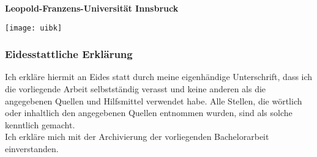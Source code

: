 \begin{titlepage}
    \textbf{Leopold-Franzens-Universit\"at Innsbruck}
    \hfill\begin{minipage}{.15\textwidth}
        \centering
        \texttt{[image: uibk]}
    \end{minipage}

    \subsubsection*{Eidesstattliche Erklärung}
    Ich erkläre hiermit an Eides statt durch meine eigenhändige Unterschrift, dass ich die vorliegende Arbeit selbstständig verasst und keine anderen als die angegebenen Quellen und Hilfsmittel verwendet habe.
    Alle Stellen, die wörtlich oder inhaltlich den angegebenen Quellen entnommen wurden, sind als solche kenntlich gemacht.\\
    [0.5cm]
    Ich erkläre mich mit der Archivierung der vorliegenden Bachelorarbeit einverstanden.\\
    [1cm]


    \begin{figure}[h!]
        \hfill
    \end{figure}
\end{titlepage}
